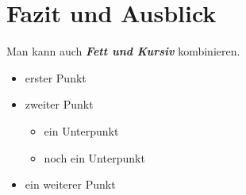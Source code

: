 
\chapter{Fazit und Ausblick} %
\label{chap:fazit}

Man kann auch \textbf{\textit{Fett und Kursiv}} kombinieren.

\begin{itemize}
    \item erster Punkt
    \item zweiter Punkt
    \begin{itemize}
        \item ein Unterpunkt
        \item noch ein Unterpunkt
    \end{itemize}
    \item ein weiterer Punkt
\end{itemize}
